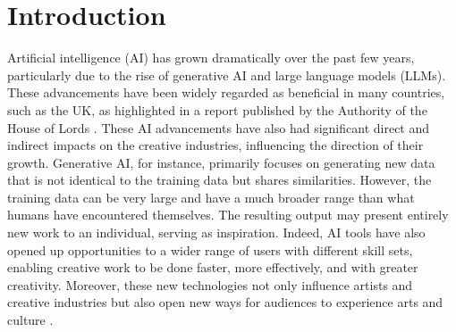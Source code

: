 \documentclass[11pt,a4paper]{article}
\begin{document}
\tableofcontents

\newpage

\section{Introduction}

Artificial intelligence (AI) has grown dramatically over the past few years, particularly due to the rise of generative AI and large language models (LLMs). These advancements have been widely regarded as beneficial in many countries, such as the UK, as highlighted in a report published by the Authority of the House of Lords \cite{UK:Large:2024}. These AI advancements have also had significant direct and indirect impacts on the creative industries, influencing the direction of their growth. Generative AI, for instance, primarily focuses on generating new data that is not identical to the training data but shares similarities. However, the training data can be very large and have a much broader range than what humans have encountered themselves. The resulting output may present entirely new work to an individual, serving as inspiration. 
Indeed, AI tools have also opened up opportunities to a wider range of users with different skill sets, enabling creative work to be done faster, more effectively, and with greater creativity. Moreover, these new technologies not only influence artists and creative industries but also open new ways for audiences to experience arts and culture \cite{Jeary2024}.
\end{document}
